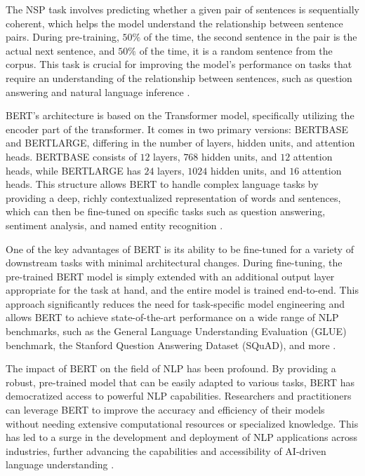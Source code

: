 The NSP task involves predicting whether a given pair of sentences is sequentially coherent,
which helps the model understand the relationship between sentence pairs.
During pre-training, $50\%$ of the time, the second sentence in the pair is the actual next sentence, 
and $50\%$ of the time, it is a random sentence from the corpus.
This task is crucial for improving the model's performance on tasks that require an understanding of the relationship between sentences, 
such as question answering and natural language inference \cite{devlin2019bert}.

BERT's architecture is based on the Transformer model, specifically utilizing the encoder part of the transformer. 
It comes in two primary versions: BERTBASE and BERTLARGE, differing in the number of layers, hidden units, and attention heads. 
BERTBASE consists of $12$ layers, $768$ hidden units, and $12$ attention heads, while BERTLARGE has $24$ layers, $1024$ hidden units, and $16$ attention heads.
This structure allows BERT to handle complex language tasks by providing a deep, 
richly contextualized representation of words and sentences, which can then be fine-tuned on specific tasks such as question answering, sentiment analysis, and named entity recognition \cite{devlin2019bert}.

One of the key advantages of BERT is its ability to be fine-tuned for a variety of downstream tasks with minimal architectural changes. 
During fine-tuning, the pre-trained BERT model is simply extended with an additional output layer appropriate for the task at hand, and the entire model is trained end-to-end. 
This approach significantly reduces the need for task-specific model engineering 
and allows BERT to achieve state-of-the-art performance on a wide range of NLP 
benchmarks, 
such as the General Language Understanding Evaluation (GLUE) benchmark, 
the Stanford Question Answering Dataset (SQuAD), and more \cite{devlin2019bert}.

The impact of BERT on the field of NLP has been profound. 
By providing a robust, pre-trained model that can be easily adapted to various tasks,
BERT has democratized access to powerful NLP capabilities. 
Researchers and practitioners can leverage BERT to improve the accuracy and 
efficiency of their models without needing extensive computational resources or 
specialized knowledge. This has led to a surge in the development and deployment of NLP applications across industries, 
further advancing the capabilities and accessibility of AI-driven language understanding \cite{devlin2019bert}.